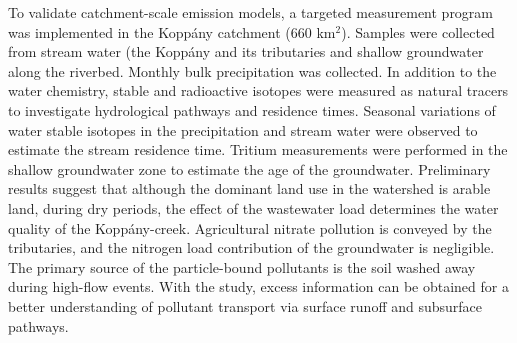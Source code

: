 \newpage{}
{}
\begin{flushleft}









\end{flushleft}

\noindent

To validate catchment-scale emission models, a targeted measurement program was implemented in the Koppány catchment (660 km$^2$). Samples were collected from stream water (the Koppány and its tributaries and shallow groundwater along the riverbed. Monthly bulk precipitation was collected. In addition to the water chemistry, stable and radioactive isotopes were measured as natural tracers to investigate hydrological pathways and residence times. Seasonal variations of water stable isotopes in the precipitation and stream water were observed to estimate the stream residence time. Tritium measurements were performed in the shallow groundwater zone to estimate the age of the groundwater. Preliminary results suggest that although the dominant land use in the watershed is arable land, during dry periods, the effect of the wastewater load determines the water quality of the Koppány-creek. Agricultural nitrate pollution is conveyed by the tributaries, and the nitrogen load contribution of the groundwater is negligible. The primary source of the particle-bound pollutants is the soil washed away during high-flow events. With the study, excess information can be obtained for a better understanding of pollutant transport via surface runoff and subsurface pathways.

